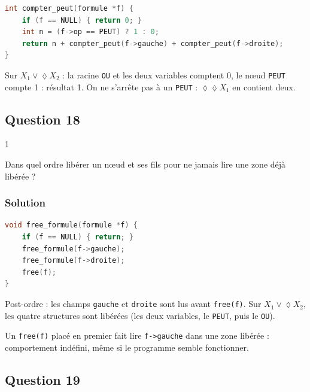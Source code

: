 \documentclass[11pt,a4paper]{article}
\providecommand{\Diamond}{\lozenge}
\begin{document}
\begin{lstlisting}[language=C]
int compter_peut(formule *f) {
    if (f == NULL) { return 0; }
    int n = (f->op == PEUT) ? 1 : 0;
    return n + compter_peut(f->gauche) + compter_peut(f->droite);
}
\end{lstlisting}

Sur \(X_1\vee\Diamond X_2\) : la racine \texttt{OU} et les deux variables comptent 0, le nœud \texttt{PEUT} compte 1 : résultat 1. On ne s'arrête pas à un \texttt{PEUT} : \(\Diamond\Diamond X_1\) en contient deux.

\hypertarget{question-18}{%
\subsection{Question 18}\label{question-18}}

\begin{indication}{1}

Dans quel ordre libérer un nœud et ses fils pour ne jamais lire une zone déjà libérée ?

\end{indication}

\hypertarget{solution-17}{%
\subsubsection{Solution}\label{solution-17}}

\begin{lstlisting}[language=C]
void free_formule(formule *f) {
    if (f == NULL) { return; }
    free_formule(f->gauche);
    free_formule(f->droite);
    free(f);
}
\end{lstlisting}

Post-ordre : les champs \texttt{gauche} et \texttt{droite} sont lus avant \texttt{free(f)}. Sur \(X_1\vee\Diamond X_2\), les quatre structures sont libérées (les deux variables, le \texttt{PEUT}, puis le \texttt{OU}).

\begin{piege}

Un \texttt{free(f)} placé en premier fait lire \texttt{f-\textgreater{}gauche} dans une zone libérée : comportement indéfini, même si le programme semble fonctionner.

\end{piege}

\hypertarget{question-19}{%
\subsection{Question 19}\label{question-19}}
\end{document}
